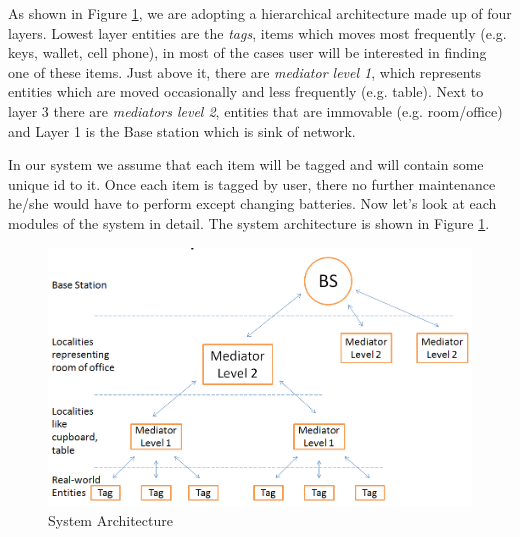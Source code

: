 \documentclass [a4paper,12pt]{book}
\begin{document}
As shown in Figure \ref{system:arch}, we are adopting a hierarchical architecture made up of four layers. Lowest layer entities are the \emph{tags}, items which moves most frequently (e.g. keys, wallet, cell phone), in most of the cases user will be interested in finding one of these items. Just above it, there are \emph{mediator level 1}, which represents entities which are moved occasionally and less frequently (e.g. table). Next to layer 3 there are \emph{mediators level 2}, entities that are immovable (e.g. room/office) and Layer 1 is the Base station which is sink of network.

In our system we assume that each item will be tagged and will contain some unique id to it. Once each item is tagged by user, there no further maintenance he/she would have to perform except changing batteries. Now let's look at each modules of the system in detail. The system architecture is shown in Figure \ref{system:arch}.

\vspace{0.5cm}
\begin{figure}[!h]
\vspace{0.5cm}
\begin{center}
\includegraphics[scale=0.65]{images/8.png}
\caption{System Architecture}
\label{system:arch}
\end{center}
\end{figure}
\end{document}

